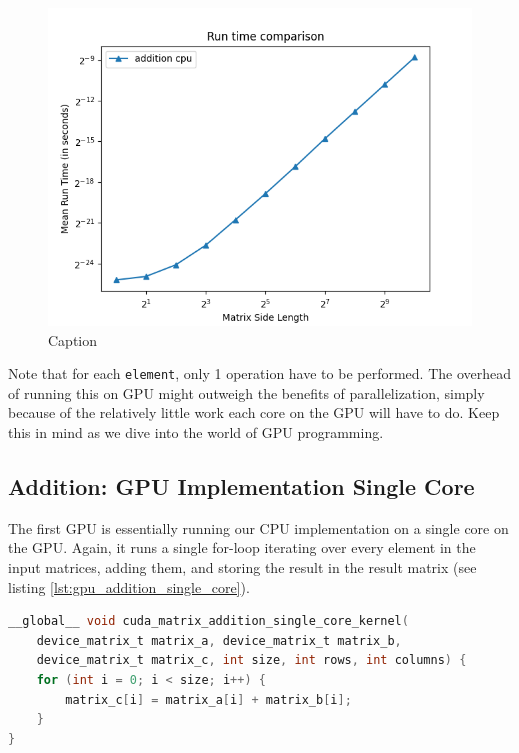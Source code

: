 \begin{figure}[h]
    \centering
    \includegraphics[width=\textwidth]{SavedBenchmarksAndDiagrams/Machine 2/Addition CPU.png}
    \caption{Caption}
    \label{fig:enter-label}
\end{figure}

Note that for each \texttt{element}, only 1 operation have to be performed. The overhead of running this on GPU might outweigh the benefits of parallelization, simply because of the relatively little work each core on the GPU will have to do. Keep this in mind as we dive into the world of GPU programming.

\subsection{Addition: GPU Implementation Single Core}
The first GPU is essentially running our CPU implementation on a single core on the GPU. Again, it runs a single for-loop iterating over every element in the input matrices, adding them, and storing the result in the result matrix (see listing \ref{lst:gpu_addition_single_core}).

\begin{lstlisting}[language=C, caption={GPU addition single core}, label={lst:gpu_addition_single_core}]
__global__ void cuda_matrix_addition_single_core_kernel(
    device_matrix_t matrix_a, device_matrix_t matrix_b,
    device_matrix_t matrix_c, int size, int rows, int columns) {
    for (int i = 0; i < size; i++) {
        matrix_c[i] = matrix_a[i] + matrix_b[i];
    }
}
\end{lstlisting}

